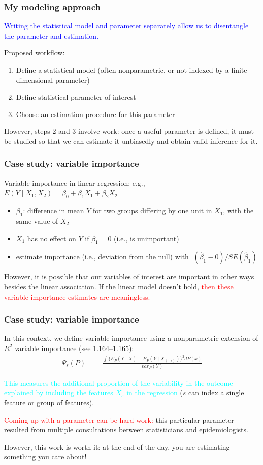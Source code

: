\documentclass[12pt, 
hyperref={colorlinks=true, linkcolor=blue, urlcolor=cyan},dvipsnames]{beamer}
\begin{document}
\begin{frame}
\frametitle{My modeling approach}
\textcolor{blue}{Writing the statistical model and parameter separately allow us to disentangle the parameter and estimation.}

Proposed workflow:
\begin{enumerate}
\item Define a statistical model (often nonparametric, or not indexed by a finite-dimensional parameter) \pause
\item Define statistical parameter of interest \pause
\item Choose an estimation procedure for this parameter
\end{enumerate} \pause

However, steps 2 and 3 involve work: once a useful parameter is defined, it must be studied so that we can estimate it unbiasedly and obtain valid inference for it.
\end{frame}

\begin{frame}
\frametitle{Case study: variable importance}
Variable importance in linear regression: e.g., $E(Y \mid X_1, X_2) = \beta_0 + \beta_1 X_1 + \beta_2 X_2$ \pause
\begin{itemize}
\item $\beta_1$: difference in mean $Y$ for two groups differing by one unit in $X_1$, with the same value of $X_2$ \pause
\item $X_1$ has no effect on $Y$ if $\beta_1 = 0$ (i.e., is unimportant) \pause
\item estimate importance (i.e., deviation from the null) with $\lvert (\hat{\beta}_1 - 0)/SE(\hat{\beta}_1) \rvert$ \pause
\end{itemize}

However, it is possible that our variables of interest are important in other ways besides the linear association. If the linear model doesn't hold, \textcolor{red}{then these variable importance estimates are meaningless.}
\end{frame}


\begin{frame}
\frametitle{Case study: variable importance}
In this context, we define variable importance using a nonparametric extension of $R^2$ variable importance (see 1.164--1.165):
\begin{align*}
\Psi_s(P) = &\ \frac{\int \{E_P(Y \mid X) - E_P(Y \mid X_{(-s)})\}^2 dP(x)}{var_P(Y)}
\end{align*}

\textcolor{cyan}{This measures the additional proportion of the variability in the outcome explained by including the features $X_s$ in the regression} ($s$ can index a single feature or group of features). \pause

\textcolor{red}{Coming up with a parameter can be hard work:} this particular parameter resulted from multiple consultations between statisticians and epidemiologists.

However, this work is worth it: at the end of the day, you are estimating something you care about!
\end{frame}
\end{document}
